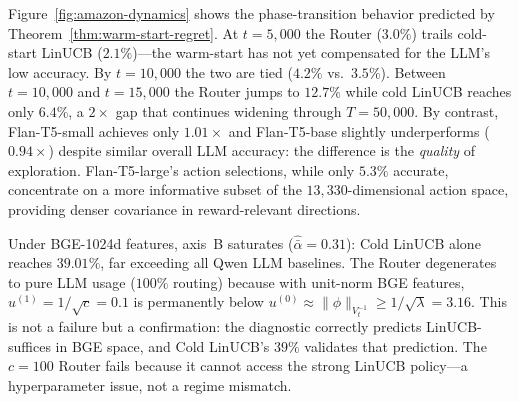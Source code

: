 \documentclass{article}
\theoremstyle{definition}
\theoremstyle{remark}
\theoremstyle{remark}
\begin{document}
Figure~\ref{fig:amazon-dynamics} shows the phase-transition behavior
predicted by Theorem~\ref{thm:warm-start-regret}. At $t=5{,}000$ the
Router ($3.0\%$) trails cold-start LinUCB ($2.1\%$)---the warm-start has
not yet compensated for the LLM's low accuracy. By $t=10{,}000$ the two
are tied ($4.2\%$ vs.\ $3.5\%$). Between $t=10{,}000$ and $t=15{,}000$ the
Router jumps to $12.7\%$ while cold LinUCB reaches only $6.4\%$, a
$2\times$ gap that continues widening through $T=50{,}000$. By contrast,
Flan-T5-small achieves only $1.01\times$ and Flan-T5-base slightly
underperforms ($0.94\times$) despite similar overall LLM accuracy: the
difference is the \emph{quality} of exploration. Flan-T5-large's action
selections, while only $5.3\%$ accurate, concentrate on a more informative
subset of the $13{,}330$-dimensional action space, providing denser
covariance in reward-relevant directions.

Under BGE-1024d features, axis~B saturates ($\widehat{\bar\alpha}=0.31$):
Cold LinUCB alone reaches $39.01\%$, far exceeding all Qwen LLM baselines.
The Router degenerates to pure LLM usage ($100\%$ routing) because with
unit-norm BGE features, $u^{(1)}=1/\sqrt{c}=0.1$ is permanently below
$u^{(0)}\approx\|\phi\|_{V_t^{-1}}\!\ge\!1/\sqrt{\lambda}\!=\!3.16$. This is
not a failure but a confirmation: the diagnostic correctly predicts
LinUCB-suffices in BGE space, and Cold LinUCB's $39\%$ validates that
prediction. The $c\!=\!100$ Router fails because it cannot access the strong
LinUCB policy---a hyperparameter issue, not a regime mismatch.
\end{document}
